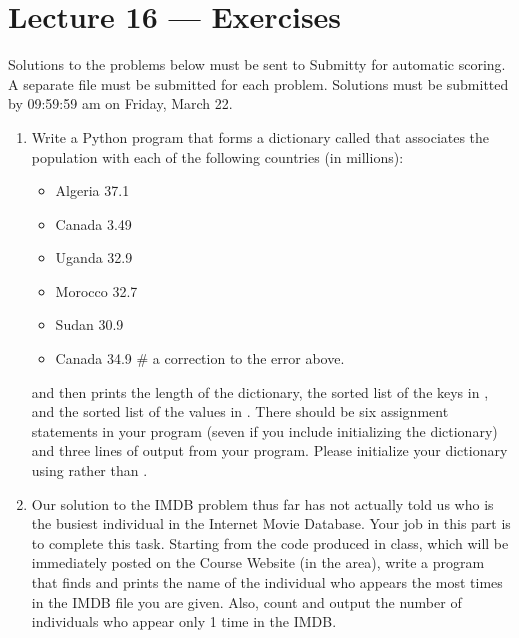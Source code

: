 \documentclass[letterpaper,10pt,english]{sphinxmanual}
\begin{document}
\chapter{Lecture 16 — Exercises}
\label{\detokenize{lecture_notes/lec16_dictionaries1_exercises/exercises:lecture-16-exercises}}\label{\detokenize{lecture_notes/lec16_dictionaries1_exercises/exercises::doc}}
Solutions to the problems below must be sent to Submitty for
automatic scoring. A separate file must be submitted for each problem.
Solutions must be submitted by 09:59:59 am on Friday, March 22.
\begin{enumerate}
\def\theenumi{\arabic{enumi}}
\def\labelenumi{\theenumi .}
\makeatletter\def\p@enumii{\p@enumi \theenumi .}\makeatother
\item {} 
Write a Python program that forms a dictionary called 
that associates the population with each of the following
countries (in millions):
\begin{itemize}
\item {} 
Algeria 37.1

\item {} 
Canada 3.49

\item {} 
Uganda 32.9

\item {} 
Morocco 32.7

\item {} 
Sudan 30.9

\item {} 
Canada 34.9   \# a correction to the error above.

\end{itemize}

and then prints the length of the  dictionary, the
sorted list of the keys in , and the sorted list of the
values in . There should be six assignment statements
in your program (seven if you include initializing the dictionary)
and three lines of output from your program.
Please initialize your dictionary using  rather than \sphinxcode{\sphinxupquote{\{\}}}.

\item {} 
Our solution to the IMDB problem thus far has not actually told us
who is the busiest individual in the Internet Movie Database.
Your job in this part is to complete this task. Starting from the
code produced in class, which will be immediately posted on the
Course Website (in the  area), write a
program that finds and prints the name of the individual who
appears the most times in the IMDB file you are given. Also, count
and output the number of individuals who appear only 1 time in the
IMDB.


\end{enumerate}
\end{document}
